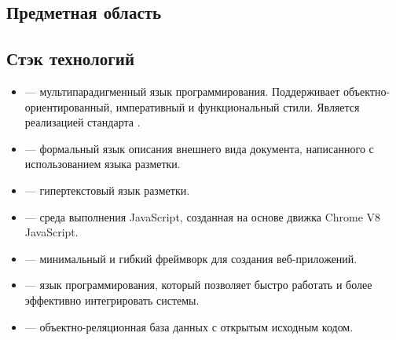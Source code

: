 \subsection{Предметная область}


\subsection{Стэк технологий}
\begin{itemize}
    \item \textcite{wiki:js} --- мультипарадигменный язык программирования. Поддерживает объектно-ориентированный, императивный и функциональный стили. Является реализацией стандарта \textcite{wiki:es}.
    \item \textcite{wiki:css} --- формальный язык описания внешнего вида документа, написанного с использованием языка разметки.
    \item \textcite{wiki:html} --- гипертекстовый язык разметки.
    \item \textcite{node.js} --- среда выполнения JavaScript, созданная на основе движка Chrome V8 JavaScript.
    \item \textcite{express} --- минимальный и гибкий \textcite{node.js} фреймворк для создания веб-приложений.
    \item \textcite{python} --- язык программирования, который позволяет быстро работать и более эффективно интегрировать системы.
    \item \textcite{postgres} --- объектно-реляционная база данных с открытым исходным кодом.
\end{itemize}
\clearpage
